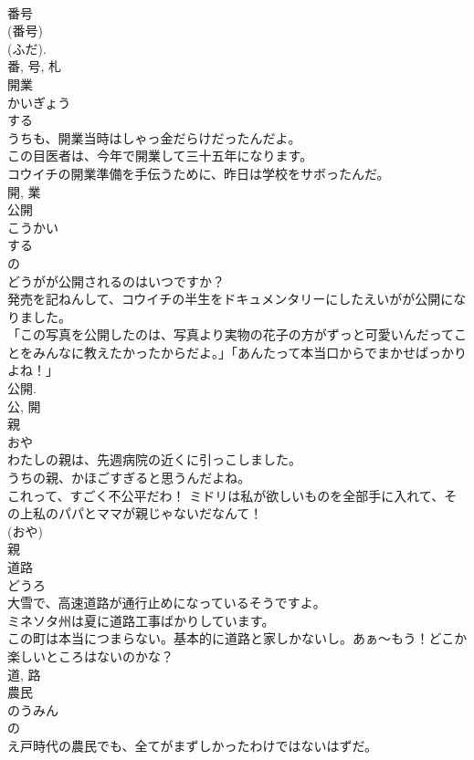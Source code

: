 \documentclass[8pt]{extreport}
\begin{document}
\begin{CJK}{UTF8}{min}
\\	番号 
\\	(番号) 
\\	(ふだ). 
\\	番, 号, 札	
\\	開業	
\\	かいぎょう	
\\	する 
\\	うちも、開業当時はしゃっ金だらけだったんだよ。	
\\	この目医者は、今年で開業して三十五年になります。	
\\	コウイチの開業準備を手伝うために、昨日は学校をサボったんだ。	
\\	開, 業	
\\	公開	
\\	こうかい	
\\	する 
\\	の 
\\	どうがが公開されるのはいつですか？	
\\	発売を記ねんして、コウイチの半生をドキュメンタリーにしたえいがが公開になりました。	
\\	「この写真を公開したのは、写真より実物の花子の方がずっと可愛いんだってことをみんなに教えたかったからだよ。」「あんたって本当口からでまかせばっかりよね！」	
\\	公開.	
\\	公, 開	
\\	親	
\\	おや	
\\	わたしの親は、先週病院の近くに引っこしました。	
\\	うちの親、かほごすぎると思うんだよね。	
\\	これって、すごく不公平だわ！ ミドリは私が欲しいものを全部手に入れて、その上私のパパとママが親じゃないだなんて！	
\\	(おや) 
\\	親	
\\	道路	
\\	どうろ	
\\	大雪で、高速道路が通行止めになっているそうですよ。	
\\	ミネソタ州は夏に道路工事ばかりしています。	
\\	この町は本当につまらない。基本的に道路と家しかないし。あぁ〜もう！どこか楽しいところはないのかな？	
\\	道, 路	
\\	農民	
\\	のうみん	
\\	の 
\\	え戸時代の農民でも、全てがまずしかったわけではないはずだ。	

\end{CJK}
\end{document}
